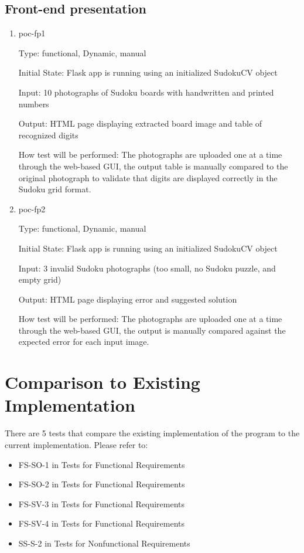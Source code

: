 \documentclass[11pt]{article}
\begin{document}
\subsection{Front-end presentation}
\begin{enumerate}

\item{poc-fp1\\}

Type: functional, Dynamic, manual
					
Initial State: Flask app is running using an initialized SudokuCV object
					
Input: 10 photographs of Sudoku boards with handwritten and printed numbers
					
Output: HTML page displaying extracted board image and table of recognized digits 
					
How test will be performed: The photographs are uploaded one at a time through the web-based GUI, the output table is manually compared to the original photograph to validate that digits are displayed correctly in the Sudoku grid format.

\item{poc-fp2\\}

Type: functional, Dynamic, manual
					
Initial State: Flask app is running using an initialized SudokuCV object
					
Input: 3 invalid Sudoku photographs (too small, no Sudoku puzzle, and empty grid)
					
Output: HTML page displaying error and suggested solution
					
How test will be performed: The photographs are uploaded one at a time through the web-based GUI, the output is manually compared against the expected error for each input image.

\newpage

\end{enumerate}
	
\section{Comparison to Existing Implementation}

There are 5 tests that compare the existing implementation of the program to the current implementation. Please refer to:

\begin{itemize}
    \item FS-SO-1 in Tests for Functional Requirements
    \item FS-SO-2 in Tests for Functional Requirements
    \item FS-SV-3 in Tests for Functional Requirements
    \item FS-SV-4 in Tests for Functional Requirements
    \item SS-S-2 in Tests for Nonfunctional Requirements
\end{itemize}
\end{document}
